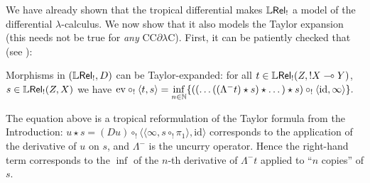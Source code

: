 %
We have already shown that the tropical differential makes $\mathbb{L} \mathsf{Rel}_{!}$ a model of the differential $\lambda$-calculus. We now show that it also models the Taylor expansion (this needs not be true for \emph{any} CC$\partial\lambda$C).
First, it can be patiently checked that (see \cite[Definition 4.22]{Manzo2012}):
%
\begin{theorem}\label{thm:modelsTaylor}
Morphisms in $(\mathbb{L} \mathsf{Rel}_{!},D)$ can be Taylor-expanded: for all $t\in{\mathbb{L}\mathsf{Rel}_!}(Z,!X\multimap Y)$, $s\in{\mathbb{L}\mathsf{Rel}_!}(Z,X)$ we have %
  $\mathrm{ev}\circ_!\langle t,s\rangle =
  \inf\limits_{n\in\mathbb{N}}
  \{((\dots((\Lambda^- t)\star s)\star \dots)\star s)\circ_! \langle \mathrm{id},\infty \rangle\}.$
\end{theorem}
The equation above is a tropical reformulation of the Taylor formula from the Introduction:
$u\star s= (Du)\circ_{!} \langle \langle  \infty, s\circ_{!} \pi_{1}\rangle,\mathrm{id}\rangle$ corresponds to the application of the derivative of $u$ on $s$, and $\Lambda^-$ is the uncurry operator.
Hence the right-hand term corresponds to the $\inf$ of the $n$-th derivative of $\Lambda^{-}t$ applied to ``$n$ copies'' of $s$.

